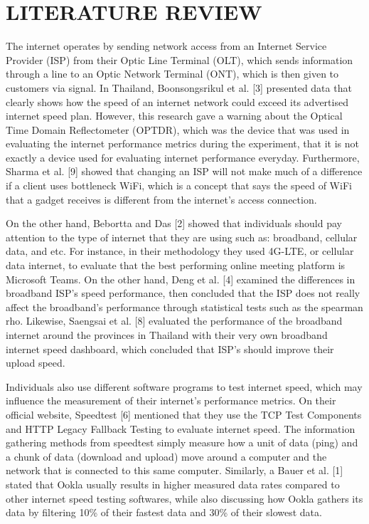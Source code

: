 \documentclass[conference]{IEEEtran}
\begin{document}
\section{LITERATURE REVIEW}

The internet operates by sending network access from an Internet Service Provider (ISP) from their Optic Line Terminal (OLT), which sends information through a line to an Optic Network Terminal (ONT), which is then given to customers via signal. In Thailand, Boonsongsrikul et al. [3] presented data that clearly shows how the speed of an internet network could exceed its advertised internet speed plan. However, this research gave a warning about the Optical Time Domain Reflectometer (OPTDR), which was the device that was used in evaluating the internet performance metrics during the experiment, that it is not exactly a device used for evaluating internet performance everyday. Furthermore, Sharma et al. [9] showed that changing an ISP will not make much of a difference if a client uses bottleneck WiFi, which is a concept that says the speed of WiFi that a gadget receives is different from the internet's access connection.

On the other hand, Bebortta and Das [2] showed that individuals should pay attention to the type of internet that they are using such as: broadband, cellular data, and etc. For instance, in their methodology they used 4G-LTE, or cellular data internet, to evaluate that the best performing online meeting platform is Microsoft Teams. On the other hand, Deng et al. [4] examined the differences in broadband ISP's speed performance, then concluded that the ISP does not really affect the broadband's performance through statistical tests such as the spearman rho. Likewise, Saengsai et al. [8] evaluated the performance of the broadband internet around the provinces in Thailand with their very own broadband internet speed dashboard, which concluded that ISP's should improve their upload speed.

Individuals also use different software programs to test internet speed, which may influence the measurement of their internet's performance metrics. On their official website, Speedtest [6] mentioned that they use the TCP Test Components and HTTP Legacy Fallback Testing to evaluate internet speed. The information gathering methods from speedtest simply measure how a unit of data (ping) and a chunk of data (download and upload) move around a computer and the network that is connected to this same computer. Similarly, a Bauer et al. [1] stated that Ookla usually results in higher measured data rates compared to other internet speed testing softwares, while also discussing how Ookla gathers its data by filtering 10\% of their fastest data and 30\% of their slowest data.
\end{document}
